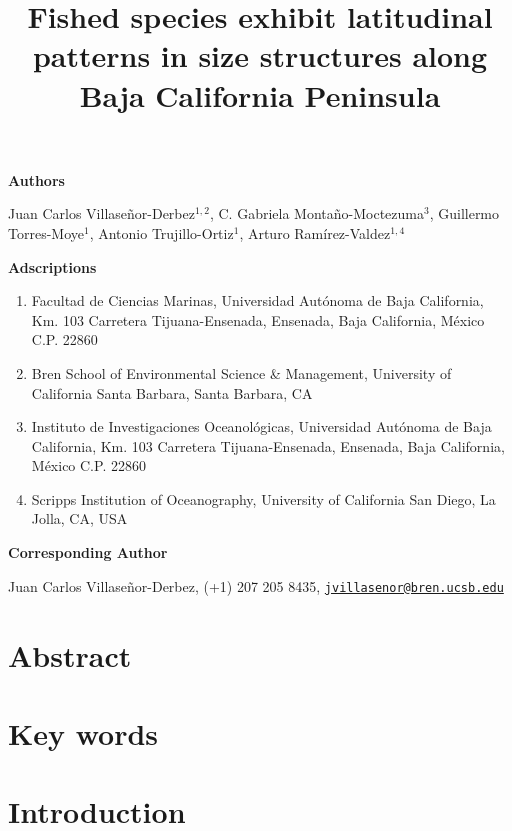\documentclass[12pt,]{article}
\title{\Large{Fished species exhibit latitudinal patterns in size structures along Baja California Peninsula}}
\author{}
\date{}
\begin{document}
\maketitle

\textbf{Authors}

Juan Carlos Villaseñor-Derbez\(^{1, 2}\), C. Gabriela
Montaño-Moctezuma\(^3\), Guillermo Torres-Moye\(^1\), Antonio
Trujillo-Ortiz\(^1\), Arturo Ramírez-Valdez\(^{1, 4}\)

\textbf{Adscriptions}

\begin{enumerate}
\def\labelenumi{\arabic{enumi}.}
\item
  Facultad de Ciencias Marinas, Universidad Autónoma de Baja California,
  Km. 103 Carretera Tijuana-Ensenada, Ensenada, Baja California, México
  C.P. 22860
\item
  Bren School of Environmental Science \& Management, University of
  California Santa Barbara, Santa Barbara, CA
\item
  Instituto de Investigaciones Oceanológicas, Universidad Autónoma de
  Baja California, Km. 103 Carretera Tijuana-Ensenada, Ensenada, Baja
  California, México C.P. 22860
\item
  Scripps Institution of Oceanography, University of California San
  Diego, La Jolla, CA, USA
\end{enumerate}

\textbf{Corresponding Author}

Juan Carlos Villaseñor-Derbez, (+1) 207 205 8435,
\href{mailto:jvillasenor@bren.ucsb.edu}{\nolinkurl{jvillasenor@bren.ucsb.edu}}

\clearpage

\section{Abstract}\label{abstract}

\section{Key words}\label{key-words}

\clearpage

\section{Introduction}\label{introduction}
\end{document}
